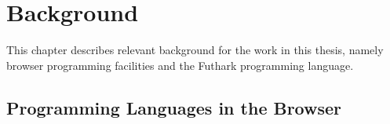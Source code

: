 \documentclass[11pt]{book}
\begin{document}
\chapter{Background}

This chapter describes relevant background for the work in this thesis, namely browser programming facilities and the Futhark programming language.






\section{Programming Languages in the Browser}








\end{document}
